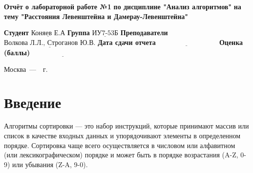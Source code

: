 \documentclass[12pt]{report}
\begin{document}
\begin{titlepage}
		
		\begin{center}
			\noindent\begin{minipage}{1.3\textwidth}\centering
				\Large\textbf{  Отчёт о лабораторной работе №1}\newline
				\textbf{по дисциплине "Анализ алгоритмов"}\newline
				\textbf{на тему "Расстояния Левенштейна и Дамерау-Левенштейна"}\newline\newline
			\end{minipage}
		\end{center}
		
		\noindent\textbf{Студент} $\underline{\text{Коняев Е.А}}$\newline\newline
		\noindent\textbf{Группа} $\underline{\text{ИУ7-53Б}}$\newline\newline
		\noindent\textbf{Преподаватели} $\underline{\text{Волкова Л.Л., Строганов Ю.В.}}$\newline\newline
		\noindent\textbf{Дата сдачи отчета}$\underline{\text{~~~~~~~~~~~~~~~~~~~~~~~~~~~}}$\newline\newline
		\noindent\textbf{Оценка (баллы)} $\underline{\text{~~~~~~~~~~~~~~~~~~~~~~~~~~~}}$\newline\newline\newline
		
		\begin{center}
			\vfill
			Москва~---~\the\year~г.
		\end{center}
	\end{titlepage}
	
	\setcounter{page}{2}
	\tableofcontents
	
	\newpage
	\chapter*{Введение}
	
	
	
Алгоритмы сортировки — это набор инструкций, которые принимают массив или список в качестве входных данных и упорядочивают элементы в определенном порядке. Сортировка чаще всего осуществляется в числовом или алфавитном (или лексикографическом) порядке и может быть в порядке возрастания (A-Z, 0-9) или убывания (Z-A, 9-0).
\end{document}
